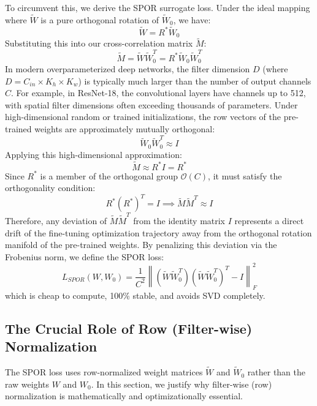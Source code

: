 \documentclass{article}
\theoremstyle{plain}
\theoremstyle{definition}
\theoremstyle{remark}
\begin{document}
To circumvent this, we derive the SPOR surrogate loss. Under the ideal mapping where $\tilde{W}$ is a pure orthogonal rotation of $\tilde{W}_0$, we have:
\begin{equation}
    \tilde{W} = R^* \tilde{W}_0
\end{equation}
Substituting this into our cross-correlation matrix $\tilde{M}$:
\begin{equation}
    \tilde{M} = \tilde{W} \tilde{W}_0^T = R^* \tilde{W}_0 \tilde{W}_0^T
\end{equation}
In modern overparameterized deep networks, the filter dimension $D$ (where $D = C_{in} \times K_h \times K_w$) is typically much larger than the number of output channels $C$. For example, in ResNet-18, the convolutional layers have channels up to 512, with spatial filter dimensions often exceeding thousands of parameters. Under high-dimensional random or trained initializations, the row vectors of the pre-trained weights are approximately mutually orthogonal:
\begin{equation}
    \tilde{W}_0 \tilde{W}_0^T \approx I
\end{equation}
Applying this high-dimensional approximation:
\begin{equation}
    \tilde{M} \approx R^* I = R^*
\end{equation}
Since $R^*$ is a member of the orthogonal group $\mathcal{O}(C)$, it must satisfy the orthogonality condition:
\begin{equation}
    R^* (R^*)^T = I \implies \tilde{M} \tilde{M}^T \approx I
\end{equation}
Therefore, any deviation of $\tilde{M} \tilde{M}^T$ from the identity matrix $I$ represents a direct drift of the fine-tuning optimization trajectory away from the orthogonal rotation manifold of the pre-trained weights. By penalizing this deviation via the Frobenius norm, we define the SPOR loss:
\begin{equation}
    L_{SPOR}(W, W_0) = \frac{1}{C^2} \left\| (\tilde{W} \tilde{W}_0^T)(\tilde{W} \tilde{W}_0^T)^T - I \right\|_F^2
\end{equation}
which is cheap to compute, 100\% stable, and avoids SVD completely.

\subsection{The Crucial Role of Row (Filter-wise) Normalization}
The SPOR loss uses row-normalized weight matrices $\tilde{W}$ and $\tilde{W}_0$ rather than the raw weights $W$ and $W_0$. In this section, we justify why filter-wise (row) normalization is mathematically and optimizationally essential.
\end{document}
